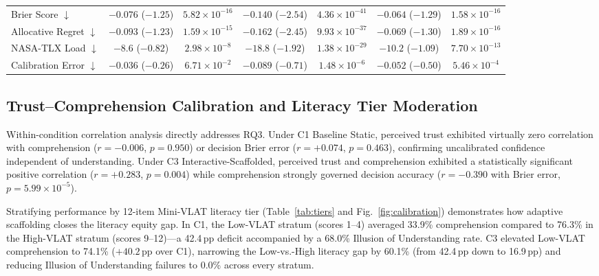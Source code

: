 \documentclass[conference]{IEEEtran}
\begin{document}
\begin{table}[!t]
{\begin{tabular}{@{}lcccccc@{}}
Brier Score $\downarrow$ & $-0.076$ ($-1.25$) & $5.82\times10^{-16}$ & $-0.140$ ($-2.54$) & $4.36\times10^{-41}$ & $-0.064$ ($-1.29$) & $1.58\times10^{-16}$ \\
Allocative Regret $\downarrow$ & $-0.093$ ($-1.23$) & $1.59\times10^{-15}$ & $-0.162$ ($-2.45$) & $9.93\times10^{-37}$ & $-0.069$ ($-1.30$) & $1.89\times10^{-16}$ \\
NASA-TLX Load $\downarrow$ & $-8.6$ ($-0.82$) & $2.98\times10^{-8}$ & $-18.8$ ($-1.92$) & $1.38\times10^{-29}$ & $-10.2$ ($-1.09$) & $7.70\times10^{-13}$ \\
Calibration Error $\downarrow$ & $-0.036$ ($-0.26$) & $6.71\times10^{-2}$ & $-0.089$ ($-0.71$) & $1.48\times10^{-6}$ & $-0.052$ ($-0.50$) & $5.46\times10^{-4}$ \\
\bottomrule
\end{tabular}}
\end{table}

\subsection{Trust--Comprehension Calibration and Literacy Tier Moderation}
Within-condition correlation analysis directly addresses RQ3. Under C1 Baseline Static, perceived trust exhibited virtually zero correlation with comprehension ($r = -0.006$, $p = 0.950$) or decision Brier error ($r = +0.074$, $p = 0.463$), confirming uncalibrated confidence independent of understanding. Under C3 Interactive-Scaffolded, perceived trust and comprehension exhibited a statistically significant positive correlation ($r = +0.283$, $p = 0.004$) while comprehension strongly governed decision accuracy ($r = -0.390$ with Brier error, $p = 5.99\times10^{-5}$).

Stratifying performance by 12-item Mini-VLAT literacy tier (Table~\ref{tab:tiers} and Fig.~\ref{fig:calibration}) demonstrates how adaptive scaffolding closes the literacy equity gap. In C1, the Low-VLAT stratum (scores 1--4) averaged 33.9\% comprehension compared to 76.3\% in the High-VLAT stratum (scores 9--12)---a 42.4\,pp deficit accompanied by a 68.0\% Illusion of Understanding rate. C3 elevated Low-VLAT comprehension to 74.1\% ($+40.2$\,pp over C1), narrowing the Low-vs.-High literacy gap by 60.1\% (from 42.4\,pp down to 16.9\,pp) and reducing Illusion of Understanding failures to 0.0\% across every stratum.
\end{document}
